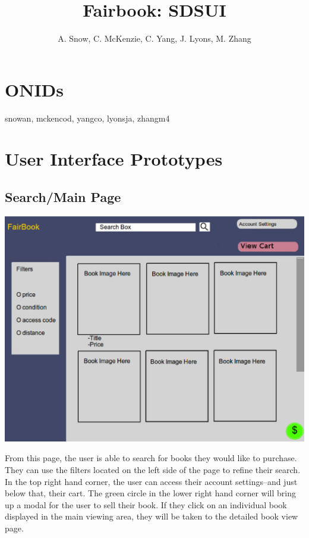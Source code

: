 \documentclass[12pt]{article}
\title{Fairbook: SDSUI}
\author{A. Snow, C. McKenzie, C. Yang, J. Lyons, M. Zhang}
\begin{document}
	\maketitle
	
	\tableofcontents
		\section{ONIDs}
		snowan, mckencod, yangco, lyonsja, zhangm4


	\section{User Interface Prototypes}


		\subsection{Search/Main Page}
		\includegraphics[width=14cm]{main_page.eps}
			\par
			From this page, the user is able to search for books they would like to purchase. 
			They can use the filters located on the left side of the page to refine their search. 
			In the top right hand corner, the user can access their account settings--and just below that, their cart. 
			The green circle in the lower right hand corner will bring up a modal for the user to sell their book. 
			If they click on an individual book displayed in the main viewing area, they will be taken to the detailed book view page.
\end{document}
